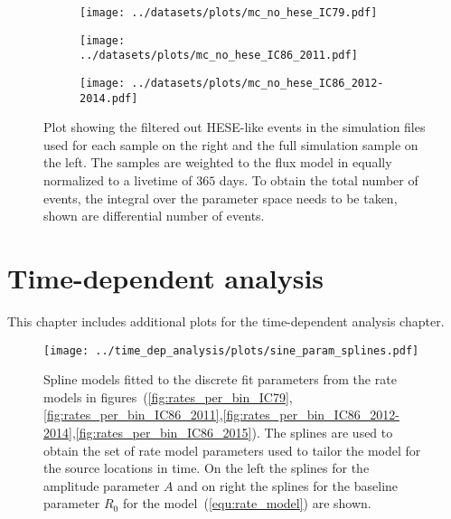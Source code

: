 \begin{figure}[H]
  \centering
  \begin{subfigure}[t]{\textwidth}
    \centering
    \texttt{[image: ../datasets/plots/mc\_no\_hese\_IC79.pdf]}
  \end{subfigure}
  \hfill
  \begin{subfigure}[t]{\textwidth}
    \centering
    \texttt{[image: ../datasets/plots/mc\_no\_hese\_IC86\_2011.pdf]}
  \end{subfigure}
  \hfill
  \begin{subfigure}[t]{\textwidth}
    \centering
    \texttt{[image: ../datasets/plots/mc\_no\_hese\_IC86\_2012-2014.pdf]}
  \end{subfigure}
  \caption[HESE decorrelation for IC79, IC86'11, IC86'12--'14]{
    Plot showing the filtered out HESE-like events in the simulation files used for each sample on the right and the full simulation sample on the left.
    The samples are weighted to the flux model in \cite{Haack:2017dxi} equally normalized to a livetime of $365$ days.
    To obtain the total number of events, the integral over the parameter space needs to be taken, shown are differential number of events.
    }
  \label{fig:mc_no_hese_79_86I_86II}
\end{figure}


\section{Time-dependent analysis}
This chapter includes additional plots for the time-dependent analysis chapter.

\enlargethispage*{5cm}
\begin{figure}[H]
  \centering
  \texttt{[image: ../time\_dep\_analysis/plots/sine\_param\_splines.pdf]}
  \caption[Parameter splines for the sine rate model per sample]{
    Spline models fitted to the discrete fit parameters from the rate models in figures~(\ref{fig:rates_per_bin_IC79},\ref{fig:rates_per_bin_IC86_2011},\ref{fig:rates_per_bin_IC86_2012-2014},\ref{fig:rates_per_bin_IC86_2015}).
    The splines are used to obtain the set of rate model parameters used to tailor the model for the source locations in time.
    On the left the splines for the amplitude parameter $A$ and on right the splines for the baseline parameter $R_0$ for the model~(\ref{equ:rate_model}) are shown.
  }
  \label{fig:tdep_sine_param_splines}
\end{figure}

